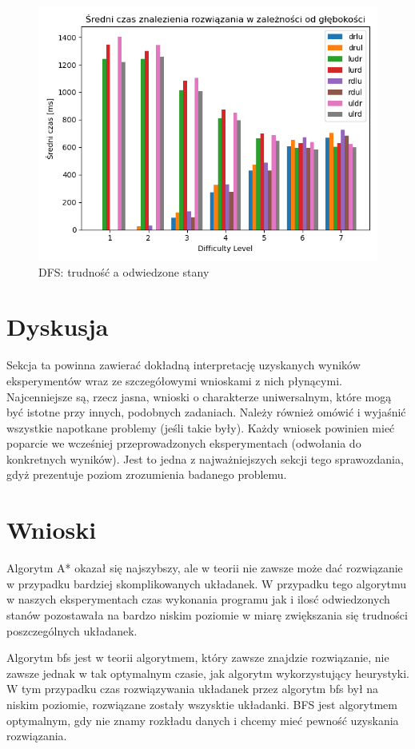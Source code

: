 \documentclass{classrep}
\begin{document}
\begin{figure}[p] \centering
 \includegraphics[width=0.9\linewidth]{./pic/dfs_time_vs_diff.png}
 \caption{DFS: trudność a odwiedzone stany}
\end{figure}

\section{Dyskusja}
{\color{blue}
Sekcja ta powinna zawierać dokładną interpretację uzyskanych wyników
eksperymentów wraz ze szczegółowymi wnioskami z nich płynącymi. Najcenniejsze
są, rzecz jasna, wnioski o charakterze uniwersalnym, które mogą być istotne
przy innych, podobnych zadaniach. Należy również omówić i wyjaśnić wszystkie
napotkane problemy (jeśli takie były). Każdy wniosek powinien mieć poparcie we
wcześniej przeprowadzonych eksperymentach (odwołania do konkretnych wyników).
Jest to jedna z najważniejszych sekcji tego sprawozdania, gdyż prezentuje
poziom zrozumienia badanego problemu.}

\section{Wnioski}
Algorytm A* okazał się najszybszy, ale w teorii nie zawsze może dać rozwiązanie w przypadku bardziej skomplikowanych układanek. W przypadku tego algorytmu w naszych eksperymentach czas wykonania programu jak i ilosć odwiedzonych stanów pozostawała na bardzo niskim poziomie w miarę zwiększania się trudności poszczególnych układanek. 

Algorytm bfs jest w teorii algorytmem, który zawsze znajdzie rozwiązanie, nie zawsze jednak w tak optymalnym czasie, jak algorytm wykorzystujący heurystyki. W tym przypadku czas rozwiązywania układanek przez algorytm bfs był na niskim poziomie, rozwiązane zostały wszysktie układanki. BFS jest algorytmem optymalnym, gdy nie znamy rozkładu danych i chcemy mieć pewność uzyskania rozwiązania.
\end{document}
